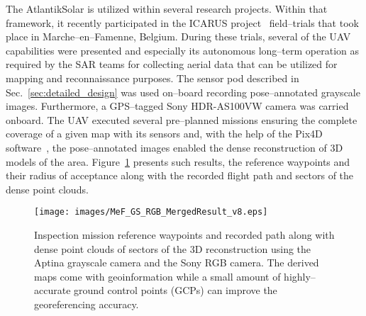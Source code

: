 The AtlantikSolar is utilized within several research projects. Within that framework, it recently participated in the ICARUS project~\cite{ICARUSsite} field--trials that took place in Marche--en--Famenne, Belgium. During these trials, several of the UAV capabilities were presented and especially its autonomous long--term operation as required by the SAR teams for collecting aerial data that can be utilized for mapping and reconnaissance purposes. The sensor pod described in Sec.~\ref{sec:detailed_design} was used on--board recording pose--annotated grayscale images. Furthermore, a GPS--tagged Sony HDR-AS100VW camera was carried onboard. The UAV executed several pre--planned missions ensuring the complete coverage of a given map with its sensors and, with the help of the Pix4D software~\cite{Pix4Dsite}, the pose--annotated images enabled the dense reconstruction of $3\textrm{D}$ models of the area. Figure~\ref{fig:mef_icarus_reconstruction} presents such results, the reference waypoints and their radius of acceptance along with the recorded flight path and sectors of the dense point clouds. 


%
\begin{figure}[htbp]
\begin{center}
  \texttt{[image: images/MeF\_GS\_RGB\_MergedResult\_v8.eps]} %
\end{center}
\caption{Inspection mission reference waypoints and recorded path along with dense point clouds of sectors of the $3\textrm{D}$ reconstruction using the Aptina grayscale camera and the Sony RGB camera. The derived maps come with geoinformation while a small amount of highly--accurate ground control points (GCPs) can improve the georeferencing accuracy.  }
\label{fig:mef_icarus_reconstruction}
\end{figure}
%

